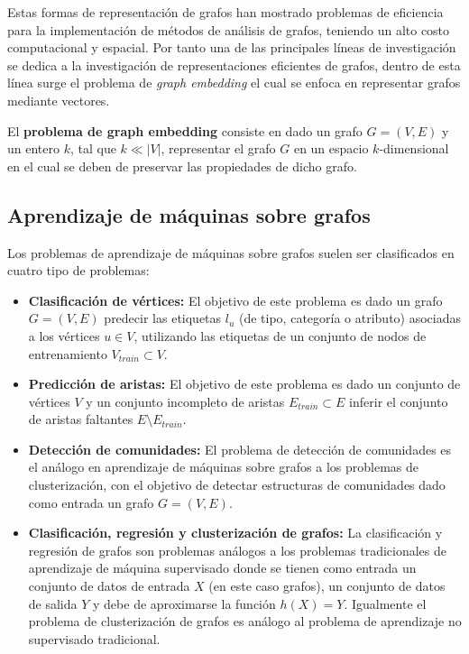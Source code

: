 Estas formas de representaci\'on de grafos han mostrado problemas de eficiencia
para la implementaci\'on de m\'etodos de an\'alisis de grafos, teniendo un
alto costo computacional y espacial. Por tanto una de las principales l\'ineas de
investigaci\'on se dedica a la investigaci\'on de representaciones eficientes de grafos,
dentro de esta l\'inea surge el problema de \textit{graph embedding} el cual se enfoca en representar
grafos mediante vectores.

\begin{definition}
    El \textbf{problema de graph embedding} consiste en dado un grafo
    $G = (V,E)$ y un entero $k$, tal que $k \ll |V|$, representar el
    grafo $G$ en un espacio $k$-dimensional en el cual se deben de preservar
    las propiedades de dicho grafo.
\end{definition}

\subsection{Aprendizaje de m\'aquinas sobre grafos}
Los problemas de aprendizaje de m\'aquinas sobre grafos suelen ser 
clasificados en cuatro tipo de problemas:

\begin{itemize}
    \item \textbf{Clasificaci\'on de v\'ertices: } El objetivo de este problema es dado un grafo $G = (V,E)$
    predecir las etiquetas $l_u$ (de tipo, categor\'ia o atributo) asociadas
    a los v\'ertices $u \in V$, utilizando las etiquetas de un conjunto de nodos de entrenamiento $V_{train} \subset V$.
    \item \textbf{Predicci\'on de aristas: } El objetivo de este problema es dado un conjunto de
    v\'ertices $V$ y un conjunto incompleto de aristas $E_{train} \subset E$ inferir el conjunto
    de aristas faltantes $ E \setminus E_{train}$.
    \item \textbf{Detecci\'on de comunidades: } El problema de detecci\'on de comunidades es el an\'alogo
    en aprendizaje de m\'aquinas sobre grafos a los problemas de clusterizaci\'on, con el objetivo de
    detectar estructuras de comunidades dado como entrada un grafo $G = (V,E)$.
    \item \textbf{Clasificaci\'on, regresi\'on y clusterizaci\'on de grafos: } La clasificaci\'on y regresi\'on de grafos son problemas
    an\'alogos a los problemas tradicionales de aprendizaje de m\'aquina supervisado donde se tienen como entrada un conjunto de
    datos de entrada $X$ (en este caso grafos), un conjunto de datos de salida $Y$ y debe de aproximarse la funci\'on $h(X) = Y$. Igualmente
    el problema de clusterizaci\'on de grafos es an\'alogo al problema de aprendizaje no supervisado tradicional. 
\end{itemize}

